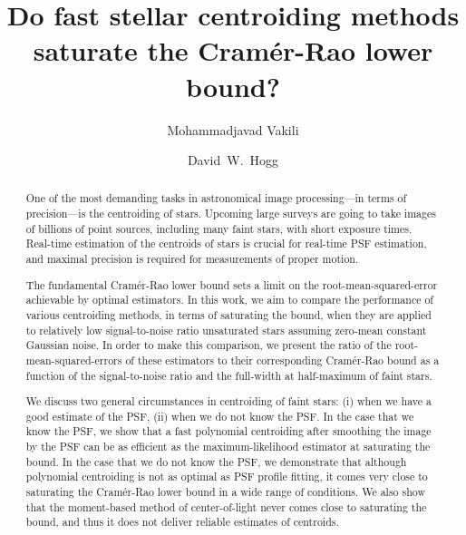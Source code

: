 \documentclass[onecolumn]{aastex61}
\newcommand{\todo}[1]{{\textcolor{dred}{ #1}}}
\begin{document}
\title{Do fast stellar centroiding methods saturate the Cram\'{e}r-Rao lower bound?}

\author{Mohammadjavad Vakili}
\author{David~W.~Hogg}



\begin{abstract}
One of the most demanding tasks in astronomical image processing---in terms of precision---is 
the centroiding of stars. Upcoming large surveys are going to take images of 
billions of point sources, including many faint stars, with short exposure times. 
Real-time estimation of the centroids of stars is crucial for real-time PSF estimation, 
and maximal precision is required for measurements of proper motion. 

\todo{The fundamental Cram\'{e}r-Rao lower bound sets a limit on the root-mean-squared-error 
achievable by optimal estimators. In this work, we aim to compare 
the performance of various centroiding methods, in terms of saturating the bound, when they 
are applied to relatively low signal-to-noise ratio unsaturated stars assuming zero-mean 
constant Gaussian noise. In order to make this comparison, we present the ratio of the root-mean-squared-errors of these estimators to their corresponding Cram\'{e}r-Rao bound as a function of the signal-to-noise ratio and the full-width at half-maximum of faint stars.}

We discuss two general circumstances in centroiding of faint stars: (i) when we have a good estimate
of the PSF, (ii) when we do not know the PSF. \todo{In the case that we know the PSF, 
we show that a fast polynomial centroiding after smoothing the image by the PSF can be 
as efficient as the maximum-likelihood estimator at saturating the bound. 
In the case that we do not know the PSF, we demonstrate that although polynomial centroiding is not as optimal as PSF profile fitting, it comes very close to saturating the Cram\'{e}r-Rao lower bound in a wide range of conditions. We also show that the moment-based method of center-of-light 
never comes close to saturating the bound, and thus it does not deliver reliable estimates of centroids.}    

\end{abstract}
\end{document}
